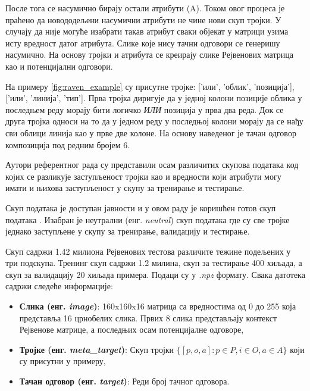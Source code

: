 \documentclass[a4paper, 12pt, master, utf8]{etf}
\begin{document}
После тога се насумично бирају остали атрибути ($\mathrm{A}$). Током овог процеса је праћено да новододељени насумични атрибути не чине нови скуп тројки. У случају да није могуће изабрати такав атрибут сваки објекат у матрици узима исту вредност датог атрибута. 
Слике које нису тачни одговори се генеришу насумично.
На основу тројки и атрибута се креирају слике Рејвенових матрица као и потенцијални одговори.
\newline

На примеру \ref{fig:raven_example} су присутне тројке: ['или', 'облик', 'позиција'], ['или', 'линија', 'тип']. Прва тројка диригује да у једној колони позиције облика у последњем реду морају бити логичко \textit{ИЛИ} позиција у прва два реда. Док  се друга тројка односи на то да у једном реду у последњој колони морају да се
нађу сви облици линија као у прве две колоне. На основу наведеног је тачан одговор композиција под редним бројем 6.
\newline

Аутори референтног рада су представили осам различитих скупова података код којих се разликује заступљеност тројки као и вредности који атрибути могу имати и њихова заступљеност у скупу за тренирање и тестирање. 
\newline

Скуп података је доступан јавности и у овом раду је коришћен готов скуп података \cite{noauthor_procedurally_2023}.
Изабран је неутрални (енг. \textit{neutral}) скуп података где су све тројке једнако заступљене у скупу за тренирање, валидацију и тестирање. 
\newline

Скуп садржи 1.42 милиона Рејвенових тестова различите тежине подељених у три подскупа. Тренинг скуп садржи 1.2 милина, скуп за тестирање 400 хиљада, а скуп за валидацију 20 хиљада примера. Подаци су у \textit{.npz} формату.
Свака датотека садржи следеће информације:

\begin{itemize}[noitemsep]
    \item \textbf{Слика (енг. \textit{image})}: 160x160x16 матрица са вредностима од 0 до 255 која представља 16 црнобелих слика. Првих 8 слика представљају контекст Рејвенове матрице, а последњих осам потенцијалне одговоре,
    \item \textbf{Тројке (енг. \textit{meta\_target})}: Скуп тројки $\{[p, o, a]: p \in P, i \in O, a \in A\}$ који су присутни у примеру, 
    \item \textbf{Тачан одговор (енг. \textit{target})}: Реди број тачног одговора.
\end{itemize}
\end{document}
